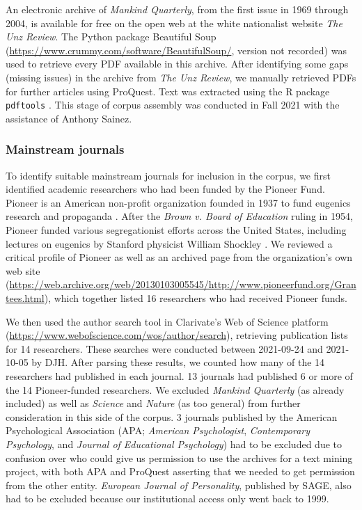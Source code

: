 \documentclass[12pt]{article}
\begin{document}
An electronic archive of \emph{Mankind Quarterly}, from the first issue in 1969 through 2004, is available for free on the open web at the white nationalist website \emph{The Unz Review}. The Python package Beautiful Soup (\url{https://www.crummy.com/software/BeautifulSoup/}, version not recorded) was used to retrieve every PDF available in this archive. After identifying some gaps (missing issues) in the archive from \emph{The Unz Review}, we manually retrieved PDFs for further articles using ProQuest. Text was extracted using the R package \texttt{pdftools} \cite[version 3.0.1]{OomsPdftoolsTextExtraction2023}. This stage of corpus assembly was conducted in Fall 2021 with the assistance of Anthony Sainez.

\hypertarget{mainstream-journals}{%
\subsubsection{Mainstream journals}\label{mainstream-journals}}

To identify suitable mainstream journals for inclusion in the corpus, we first identified academic researchers who had been funded by the Pioneer Fund. Pioneer is an American non-profit organization founded in 1937 to fund eugenics research and propaganda \cite{TuckerFundingScientificRacism2002}. After the \emph{Brown v. Board of Education} ruling in 1954, Pioneer funded various segregationist efforts across the United States, including lectures on eugenics by Stanford physicist William Shockley \cite{JacksonScienceSegregationRace2005}. We reviewed a critical profile of Pioneer \cite{MillerPioneerFundBankrolling1994} as well as an archived page from the organization's own web site (\url{https://web.archive.org/web/20130103005545/http://www.pioneerfund.org/Grantees.html}), which together listed 16 researchers who had received Pioneer funds.

We then used the author search tool in Clarivate's Web of Science platform (\url{https://www.webofscience.com/wos/author/search}), retrieving publication lists for 14 researchers. These searches were conducted between 2021-09-24 and 2021-10-05 by DJH. After parsing these results, we counted how many of the 14 researchers had published in each journal. 13 journals had published 6 or more of the 14 Pioneer-funded researchers. We excluded \emph{Mankind Quarterly} (as already included) as well as \emph{Science} and \emph{Nature} (as too general) from further consideration in this side of the corpus. 3 journals published by the American Psychological Association (APA; \emph{American Psychologist}, \emph{Contemporary Psychology}, and \emph{Journal of Educational Psychology}) had to be excluded due to confusion over who could give us permission to use the archives for a text mining project, with both APA and ProQuest asserting that we needed to get permission from the other entity. \emph{European Journal of Personality}, published by SAGE, also had to be excluded because our institutional access only went back to 1999.
\end{document}
